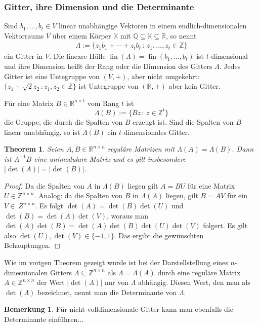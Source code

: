 \documentclass[
a4paper,12pt,
bibliography=totocnumbered,
numbers=noenddot,
]{scrartcl}
\numberwithin{equation}{subsection}
\newcommand{\Z}{\mathbb Z}
\newcommand{\Q}{\mathbb Q}
\newcommand{\R}{\mathbb R}
\newcommand{\K}{\mathbb K}
\newcommand{\lin}{\operatorname{lin}} %
\theoremstyle{plain}
\newtheorem*{thm}{Theorem}
\theoremstyle{definition}
\newtheorem*{bem}{Bemerkung}
\begin{document}
\subsubsection{Gitter, ihre Dimension und die Determinante} 

Sind $b_1,\ldots,b_t \in V$ linear unabhängige Vektoren in einem endlich-dimensionalen Vektorraums $V$ über einem Körper $\K$ mit $\Q \subseteq \K \subseteq \R$, so nennt 
\begin{align*}
		\Lambda := \{ z_1 b_1 + \cdots + z_t b_t \,: \, z_1,\ldots,z_t \in \Z \} 
\end{align*}
ein Gitter in $V$. Die lineare Hülle $\lin(\Lambda) = \lin(b_1,\ldots,b_t)$ ist $t$-dimensional  und ihre Dimension heißt der Rang oder die Dimension des Gitters $\Lambda$. 
Jedes Gitter ist eine Untegruppe von $(V,+)$, aber nicht umgekehrt: $\{ z_1 + \sqrt{2} z_2 \, :  z_1,z_2 \in \Z\}$ ist Untegruppe von $(\R,+)$ aber kein Gitter.

Für eine Matrix $B \in \R^{n \times t}$ vom Rang $t$ ist 
\[
	\Lambda(B) := \{ B z \,: \, z \in \Z^t \}
\]
die Gruppe, die durch die Spalten von $B$ erzeugt ist. Sind die Spalten von $B$ linear unabhängig, so ist $\Lambda(B)$ ein $t$-dimensionales Gitter. 

\begin{thm}
	Seien $A, B \in \R^{n \times n}$ reguläre Matrizen mit $\Lambda(A) = \Lambda(B)$. Dann ist $A^{-1} B$ eine unimodulare Matrix und es gilt insbesondere $|\det(A)| = |\det(B)|$.
\end{thm} 
\begin{proof}
	Da die Spalten von $A$ in $\Lambda(B)$ liegen gilt $A = B U$ für eine Matrix $U \in \Z^{n \times n}$. Analog: da die Spalten von $B$ in $\Lambda(A)$ liegen, gilt $B = A V$ für ein $V \in \ Z^{n \times n}$. Es folgt $\det(A) = \det(B) \det(U)$ und $\det(B) = \det(A) \det(V)$, woraus man $\det(A)\det(B) = \det(A) \det(B) \det(U)\det(V)$ folgert. Es gilt also $\det(U), \det(V) \in \{-1,1\}$. Das ergibt die gewünschten Behauptungen. 
\end{proof} 

Wie im vorigen Theorem gezeigt wurde ist bei der Darstellstellung eines $n$-dimesnionalen Gitters $\Lambda \subseteq  \Z^{n \times n}$ als $\Lambda = \Lambda(A)$ durch eine reguläre Matrix $A \in \Z^{n \times n}$ der Wert $|\det(A)|$ nur von $\Lambda$ abhängig. Diesen Wert, den man als $\det(\Lambda)$ bezeichnet,  nennt man die Determinante von $\Lambda$.

\begin{bem}
	Für nicht-volldimensionale Gitter kann man ebenfalls die Determinante einführen...
\end{bem} 
\end{document}
